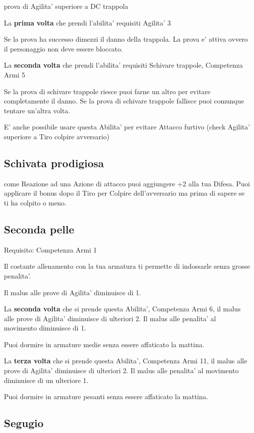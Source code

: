 \documentclass[a4paper,11pt,twoside,openany]{dndbook}
\begin{document}
prova di Agilita' superiore a DC trappola

La \textbf{prima volta} che prendi l'abilita' requisiti Agilita' 3

Se la prova ha successo dimezzi il danno della trappola. La prova e' attiva ovvero il personaggio non deve essere bloccato.

La \textbf{seconda volta} che prendi l'abilita' requisiti Schivare trappole, Competenza Armi 5

Se la prova di schivare trappole riesce puoi farne un altro per evitare completamente il danno. Se la prova di schivare trappole fallisce puoi comunque tentare un'altra volta.

E' anche possibile usare questa Abilita' per evitare Attacco furtivo (check Agilita' superiore a Tiro colpire avversario)

\subsection{Schivata prodigiosa}

come Reazione ad una Azione di attacco puoi aggiungere +2 alla tua Difesa. Puoi applicare il bonus dopo il Tiro per Colpire dell'avversario ma prima di sapere se ti ha colpito o meno.

\subsection{Seconda pelle}

Requisito: Competenza Armi 1

Il costante allenamento con la tua armatura ti permette di indossarle senza grosse penalita'.

Il malus alle prove di Agilita' diminuisce di 1.

La \textbf{seconda volta} che si prende questa Abilita', Competenza Armi 6, il malus alle prove di Agilita' diminuisce di ulteriori 2. 
Il malus alle penalita' al movimento diminuisce di 1.

Puoi dormire in armature medie senza essere affaticato la mattina.

La \textbf{terza volta} che si prende questa Abilita', Competenza Armi 11, il malus alle prove di Agilita' diminuisce di ulteriori 2. Il malus alle penalita' al movimento diminuisce di un ulteriore 1. 

Puoi dormire in armature pesanti senza essere affaticato la mattina.

\subsection{Segugio}
\end{document}
